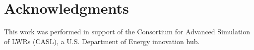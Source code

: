 \documentclass{anstrans}
\begin{document}
\section{Acknowledgments} This work was performed in support of the
Consortium for Advanced Simulation of LWRs (CASL), a U.S. Department of Energy innovation hub.

  
\end{document}
